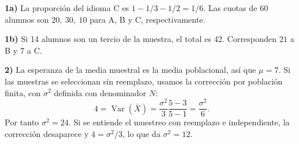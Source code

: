 \textbf{1a)} La proporción del idioma C es
$1-1/3-1/2=1/6$. Las cuotas de 60 alumnos son
$\boxed{20,\ 30,\ 10}$ para A, B y C, respectivamente.

\textbf{1b)} Si 14 alumnos son un tercio de la muestra,
el total es 42. Corresponden $\boxed{21}$ a B y $\boxed{7}$ a C.

\textbf{2)} La esperanza de la media muestral es la media
poblacional, así que $\boxed{\mu=7}$. Si las muestras se
seleccionan sin reemplazo, usamos la corrección por población
finita, con $\sigma^2$ definida con denominador $N$:
\[
4=\operatorname{Var}(\bar X)
=\frac{\sigma^2}{3}\frac{5-3}{5-1}=\frac{\sigma^2}{6}.
\]
Por tanto $\boxed{\sigma^2=24}$. Si se entiende el muestreo
con reemplazo e independiente, la corrección desaparece
y $4=\sigma^2/3$, lo que da $\boxed{\sigma^2=12}$.
